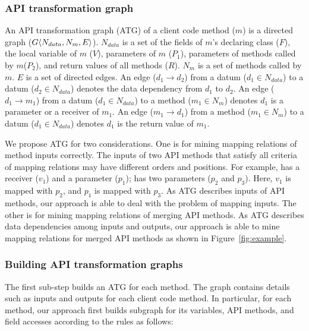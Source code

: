 \subsubsection{API transformation graph} An API transformation graph
(ATG) of a client code method ($m$) is a directed graph
($G\langle N_{data}, N_{m}, E \rangle$). $N_{data}$ is a set of the fields
of $m$'s declaring class ($F$), the local variable of $m$ ($V$),
parameters of $m$ ($P_1$), parameters of methods called by
$m$($P_2$), and return values of all methods ($R$). $N_{m}$ is a set
of methods called by $m$. $E$ is a set of directed edges. An edge
($d_1\rightarrow d_2$) from a datum ($d_1 \in N_{data}$) to a datum
($d_2 \in N_{data}$) denotes the data dependency from $d_1$ to
$d_2$. An edge ($d_1 \rightarrow m_1$) from a datum ($d_1 \in
N_{data}$)  to a method ($ m_1 \in N_{m}$) denotes $d_1$ is a
parameter or a receiver of $m_1$. An edge ($m_1 \rightarrow d_1$)
from a method ($ m_1 \in N_{m}$) to a datum ($d_1 \in N_{data}$)
denotes $d_1$ is the return value of $m_1$.

We propose ATG for two considerations. One is for mining mapping
relations of method inputs correctly. The inputs of two API methods
that satisfy all criteria of mapping relations may have different
orders and positions. For example,  has a receiver ($v_1$) and a parameter
($p_1$);  has two
parameters ($p_2$ and $p_3$). Here, $v_1$ is mapped with $p_2$, and
$p_1$ is mapped with $p_3$. As ATG describes inputs of API methods,
our approach is able to deal with the problem of mapping inputs. The
other is for mining mapping relations of merging API methods. As ATG
describes data dependencies among inputs and outputs, our approach
is able to mine mapping relations for merged API methods as shown in
Figure~\ref{fig:example}.

\subsubsection{Building API transformation graphs} The first sub-step
builds an ATG for each method. The graph contains details such as
inputs and outputs for each client code method. In particular, for
each method, our approach first builds subgraph for its variables,
API methods, and field accesses according to the rules as follows:


